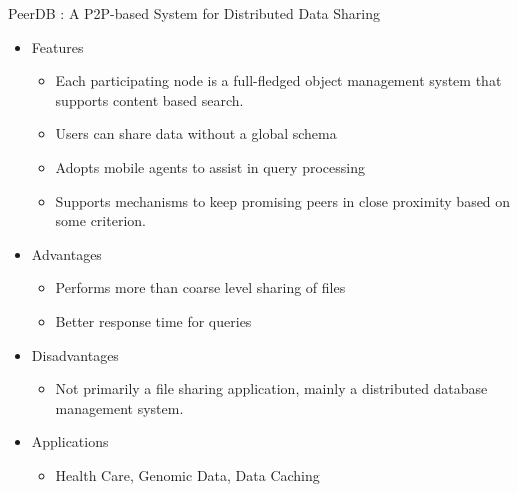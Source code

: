 \documentclass[9pt]{beamer}
\begin{document}
\begin{frame}{PeerDB : A P2P-based System for Distributed Data Sharing}
\begin{itemize}
    \item Features 
    \begin{itemize}
    \item Each participating node is a full-fledged object management system that supports content based search.
\item Users can share data without a global schema
\item Adopts mobile agents to assist in query processing
\item Supports mechanisms to keep promising peers in close proximity based on some criterion.
\end{itemize}
\end{itemize}

\begin{itemize}
    \item Advantages
    \begin{itemize}
    \item Performs more than coarse level sharing of files
\item Better response time for queries 

\end{itemize}
\end{itemize}

\begin{itemize}
    \item Disadvantages
    \begin{itemize}
    \item Not primarily a file sharing application, mainly a distributed database management system.

\end{itemize}
\end{itemize}

\begin{itemize}
    \item Applications
    \begin{itemize}
    \item Health Care, Genomic Data, Data Caching

\end{itemize}
\end{itemize}
    
\end{frame}
\end{document}
